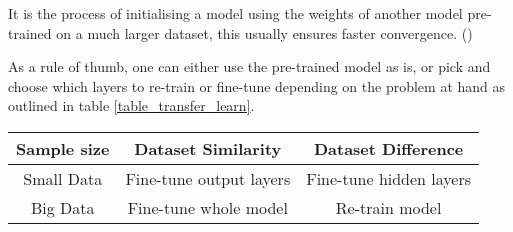 It is the process of initialising a model using the weights of another model pre-trained on a much larger dataset, this usually ensures faster convergence. (\cite{shanmugamani2018deep})

As a rule of thumb, one can either use the pre-trained model as is, or pick and choose which layers to re-train or fine-tune depending on the problem at hand as outlined in table \ref{table_transfer_learn}.

\begin{center}
    \begin{tabular}{c|c|c}     \label{table_transfer_learn}
    \textbf{Sample size} & \textbf{Dataset Similarity} & \textbf{Dataset Difference} \\
    \hline
    Small Data 
    &  Fine-tune output layers
    & Fine-tune hidden layers  \\
    \hline
    Big Data 
    &  Fine-tune whole model
    & Re-train model  \\
    \end{tabular}
\end{center}
